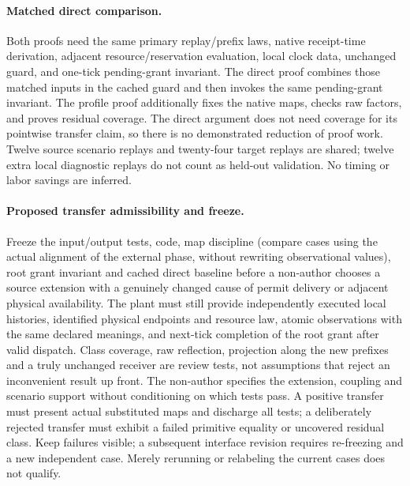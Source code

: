\documentclass{article}
\begin{document}
\paragraph{Matched direct comparison.} Both proofs need the same primary replay/prefix laws, native receipt-time derivation, adjacent resource/reservation evaluation, local clock data, unchanged guard, and one-tick pending-grant invariant. The direct proof combines those matched inputs in the cached guard and then invokes the same pending-grant invariant. The profile proof additionally fixes the native maps, checks raw factors, and proves residual coverage. The direct argument does not need coverage for its pointwise transfer claim, so there is no demonstrated reduction of proof work. Twelve source scenario replays and twenty-four target replays are shared; twelve extra local diagnostic replays do not count as held-out validation. No timing or labor savings are inferred.

\paragraph{Proposed transfer admissibility and freeze.} Freeze the input/output tests, code, map discipline (compare cases using the actual alignment of the external phase, without rewriting observational values), root grant invariant and cached direct baseline before a non-author chooses a source extension with a genuinely changed cause of permit delivery or adjacent physical availability. The plant must still provide independently executed local histories, identified physical endpoints and resource law, atomic observations with the same declared meanings, and next-tick completion of the root grant after valid dispatch. Class coverage, raw reflection, projection along the new prefixes and a truly unchanged receiver are review tests, not assumptions that reject an inconvenient result up front. The non-author specifies the extension, coupling and scenario support without conditioning on which tests pass. A positive transfer must present actual substituted maps and discharge all tests; a deliberately rejected transfer must exhibit a failed primitive equality or uncovered residual class. Keep failures visible; a subsequent interface revision requires re-freezing and a new independent case. Merely rerunning or relabeling the current cases does not qualify.
\end{document}
